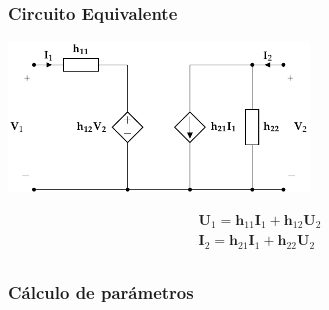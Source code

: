\subsubsection{Circuito Equivalente}
\label{sec:org18f3f5d}

\includegraphics[height=4cm]{../figs/circuitoEquivalenteH.pdf}


\[
\begin{array}{l}
  \mathbf{U}_1 = \mathbf{h}_{11} \mathbf{I}_1 + \mathbf{h}_{12} \mathbf{U}_2\\
  \mathbf{I}_2 = \mathbf{h}_{21} \mathbf{I}_1 + \mathbf{h}_{22} \mathbf{U}_2\\
\end{array}
\]

\subsubsection{Cálculo de parámetros}
\label{sec:org2210706}

